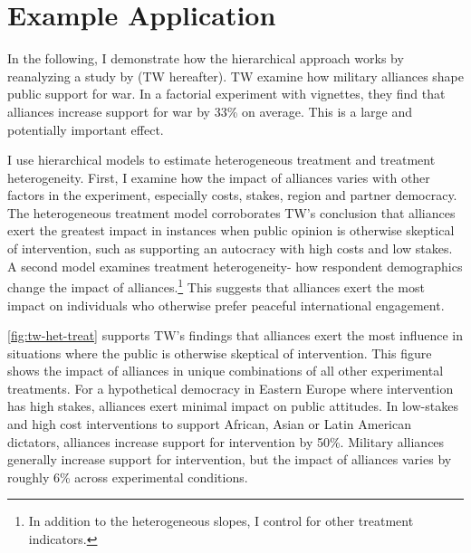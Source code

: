 \documentclass[12pt]{article}
\begin{document}
\section{Example Application} 


In the following, I demonstrate how the hierarchical approach works by reanalyzing a study by \citet{TomzWeeks2021} (TW hereafter). 
TW examine how military alliances shape public support for war.
In a factorial experiment with vignettes, they find that alliances increase support for war by 33\% on average. 
This is a large and potentially important effect. 


I use hierarchical models to estimate heterogeneous treatment and treatment heterogeneity. 
First, I examine how the impact of alliances varies with other factors in the experiment, especially costs, stakes, region and partner democracy.
The heterogeneous treatment model corroborates TW's conclusion that alliances exert the greatest impact in instances when public opinion is otherwise skeptical of intervention, such as supporting an autocracy with high costs and low stakes.  
A second model examines treatment heterogeneity- how respondent demographics change the impact of alliances.\footnote{In addition to the heterogeneous slopes, I control for other treatment indicators.}
This suggests that alliances exert the most impact on individuals who otherwise prefer peaceful international engagement.  


\autoref{fig:tw-het-treat} supports TW's findings that alliances exert the most influence in situations where the public is otherwise skeptical of intervention. 
This figure shows the impact of alliances in unique combinations of all other experimental treatments. 
For a hypothetical democracy in Eastern Europe where intervention has high stakes, alliances exert minimal impact on public attitudes. 
In low-stakes and high cost interventions to support African, Asian or Latin American dictators, alliances increase support for intervention by 50\%. 
Military alliances generally increase support for intervention, but the impact of alliances varies by roughly 6\% across experimental conditions. 
\end{document}
